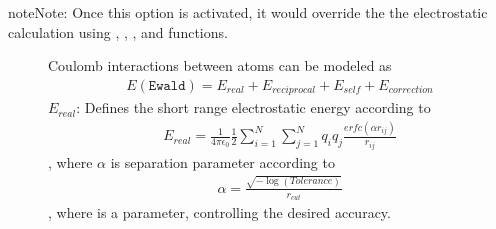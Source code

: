 \documentclass[letterpaper,10pt,english]{sphinxmanual}
\begin{document}
\begin{sphinxadmonition}{note}{Note:}
Once this option is activated, it would override the the electrostatic calculation using , , , and  functions.
\end{sphinxadmonition}
\begin{description}
\item[{}] \leavevmode
Coulomb interactions between atoms can be modeled as
\begin{equation*}
\begin{split}E(\texttt{Ewald}) = E_{real} + E_{reciprocal} + E_{self} + E_{correction}\end{split}
\end{equation*}
\(E_{real}\): Defines the short range electrostatic energy according to
\begin{equation*}
\begin{split}E_{real} = \frac{1}{4\pi \epsilon_0} \frac{1}{2} \sum_{i =1}^{N} \sum_{j = 1}^{N} q_i q_j  \frac{erfc(\alpha r_{ij})}{r_{ij}}\end{split}
\end{equation*}
, where \(\alpha\) is  separation parameter according to
\begin{equation*}
\begin{split}\alpha = \frac {\sqrt{-\log (Tolerance)}}{r_{cut}}\end{split}
\end{equation*}
, where  is a parameter, controlling the desired accuracy.


\end{description}
\end{document}
